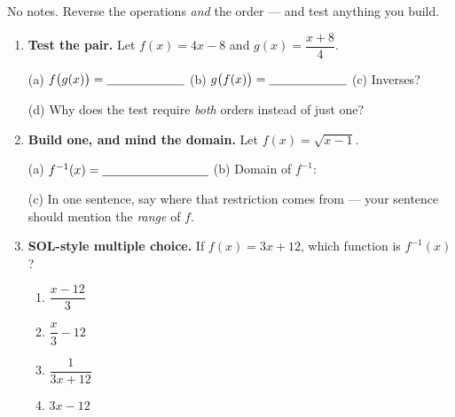 \documentclass[10pt]{article}
\begin{document}
\namedateperiod

\vspace{0.08in}

No notes. Reverse the operations \emph{and} the order --- and test anything you build.

\begin{enumerate}[leftmargin=1.8em, itemsep=10pt]
  \item \textbf{Test the pair.} Let $f(x)=4x-8$ and $g(x)=\dfrac{x+8}{4}$.
        \vspace{0.62in}

        (a) $f\big(g(x)\big)=\blank{2.2cm}$ \hspace{0.35in}
        (b) $g\big(f(x)\big)=\blank{2.2cm}$ \hspace{0.35in}
        (c) Inverses? \blank{1.6cm}

        \vspace{4pt}
        (d) Why does the test require \emph{both} orders instead of just one? \blank{5.4cm}

  \item \textbf{Build one, and mind the domain.} Let $f(x)=\sqrt{x-1}$.
        \vspace{0.55in}

        (a) $f^{-1}(x)=\blank{3.0cm}$ \hspace{0.3in}
        (b) Domain of $f^{-1}$: \blank{2.8cm}

        \vspace{5pt}
        (c) In one sentence, say where that restriction comes from --- your sentence should mention
        the \emph{range} of $f$. \writeline

  \item \textbf{SOL-style multiple choice.} If $f(x)=3x+12$, which function is $f^{-1}(x)$?
        \begin{enumerate}[label=\Alph*., leftmargin=1.9em, itemsep=1pt]
          \item $\dfrac{x-12}{3}$
          \item $\dfrac{x}{3}-12$
          \item $\dfrac{1}{3x+12}$
          \item $3x-12$
        \end{enumerate}
\end{enumerate}
\end{document}
